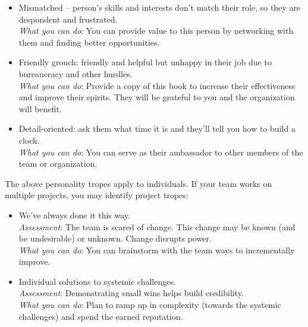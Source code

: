 \begin{itemize}
    \item Mismatched -- person's skills and interests don't match their role, so they are despondent and frustrated. \\
    \textit{What you can do}: You can provide value to this person by networking with them and finding better opportunities.
    
    \item Friendly grouch: friendly and helpful but unhappy in their job due to bureaucracy and other hurdles. \\
    \textit{What you can do}: Provide a copy of this book to increase their effectiveness and improve their spirits. They will be grateful to you and the organization will benefit.
    
    \item Detail-oriented: ask them what time it is and they'll tell you how to build a clock. \\
    \textit{What you can do}: You can serve as their ambassador to other members of the team or organization.  
\end{itemize}


The above personality tropes apply to individuals. If your team works on multiple projects, you may identify project tropes:
\begin{itemize}
    \item We've always done it this way.\\
    \textit{Assessment}: The team is scared of change. This change may be known (and be undesirable) or unknown. Change disrupts power.\\
    \textit{What you can do}: You can brainstorm with the team ways to incrementally improve. 

    \item Individual solutions to systemic challenges.\\
    \textit{Assessment}: Demonstrating small wins helps build credibility. \\
    \textit{What you can do}: Plan to ramp up in complexity (towards the systemic challenges) and spend the earned reputation.
\end{itemize}
